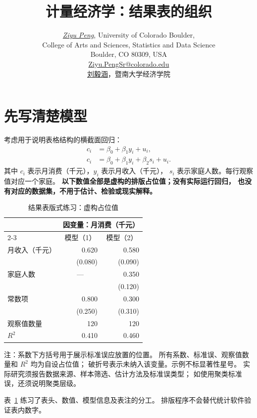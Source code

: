 \documentclass[UTF8,a4paper,fontset=fandol]{ctexart}
\title{计量经济学：结果表的组织}
\author{\href{https://github.com/pzy54154631-hub}{\textit{Ziyu Peng}}, University of Colorado Boulder,
  \\[0.1em]College of Arts and Sciences, Statistics and Data Science
  \\[0.1em]Boulder, CO 80309, USA
  \\[0.1em]\href{mailto:Ziyu.PengSr@colorado.edu}{Ziyu.PengSr@colorado.edu}
  \\[0.35em]
  \href{https://pzy54154631-hub.github.io/liuyihan/}{刘毅涵}，暨南大学经济学院}
\date{}
\begin{document}
\maketitle
\section{先写清楚模型}
考虑用于说明表格结构的横截面回归：
\begin{align}
 c_i&=\beta_0+\beta_1y_i+u_i,\label{eq:m1}\\
 c_i&=\beta_0+\beta_1y_i+\beta_2s_i+u_i.\label{eq:m2}
\end{align}
其中 $c_i$ 表示月消费（千元），$y_i$ 表示月收入（千元），
$s_i$ 表示家庭人数。每行观察值对应一个家庭。
\textbf{以下数值全部是虚构的排版占位值；没有实际运行回归，
也没有对应的数据集，不用于估计、检验或现实解释。}

\begin{table}[htbp]
\centering
\caption{结果表版式练习：虚构占位值}
\label{tab:regression}
\begin{tabular}{lrr}
\toprule
 & \multicolumn{2}{c}{因变量：月消费（千元）}\\
\cmidrule(lr){2-3}
 & \multicolumn{1}{c}{模型（1）}
 & \multicolumn{1}{c}{模型（2）}\\
\midrule
月收入（千元） & 0.620 & 0.580\\
 & (0.080) & (0.090)\\
家庭人数 & \multicolumn{1}{c}{—} & 0.350\\
 & & (0.120)\\
常数项 & 0.800 & 0.300\\
 & (0.250) & (0.310)\\
\midrule
观察值数量 & 120 & 120\\
$R^2$ & 0.410 & 0.460\\
\bottomrule
\end{tabular}
\par\smallskip
\begin{minipage}{0.88\linewidth}
\footnotesize
注：系数下方括号用于展示标准误应放置的位置。
所有系数、标准误、观察值数量和 $R^2$ 均为自设占位值；
破折号表示未纳入该变量。示例不标显著性星号。
实际研究须报告数据来源、样本筛选、估计方法及标准误类型；
如使用聚类标准误，还须说明聚类层级。
\end{minipage}
\end{table}

表~\ref{tab:regression} 练习了表头、数值、模型信息及表注的分工。
排版程序不会替代统计软件验证表内数字。
\end{document}
